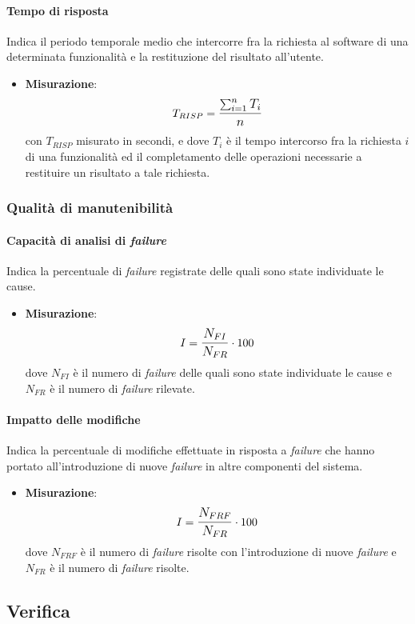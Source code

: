 \paragraph{Tempo di risposta}
Indica il periodo temporale medio che intercorre fra la richiesta al software di una determinata funzionalità e la restituzione del risultato all'utente.
\begin{itemize}
	\item \textbf{Misurazione}: 
	$$T_{RISP} = \mathlarger{\frac{\sum_{i=1}^{n} T_{i}}{n}}$$ 
	con $T_{RISP}$ misurato in secondi, e dove $T_{i}$ è il tempo intercorso fra la richiesta $i$ di una funzionalità ed il completamento delle operazioni necessarie a restituire un risultato a tale richiesta.
\end{itemize}
\subsubsection{Qualità di manutenibilità}

\paragraph{Capacità di analisi di \textit{failure}}
Indica la percentuale di \textit{failure} registrate delle quali sono state individuate le cause.
\begin{itemize}
	\item \textbf{Misurazione}: 
	$$I=\mathlarger{\frac{N_{FI}}{N_{FR}}} \cdot 100$$
	dove $N_{FI}$ è il numero di \textit{failure} delle quali sono state individuate le cause e $N_{FR}$ è il numero di \textit{failure} rilevate.
\end{itemize}

\paragraph{Impatto delle modifiche}
Indica la percentuale di modifiche effettuate in risposta a \textit{failure} che hanno portato all'introduzione di nuove \textit{failure} in altre componenti del sistema.
\begin{itemize}
	\item \textbf{Misurazione}: 
	$$I=\mathlarger{\frac{N_{FRF}}{N_{FR}}} \cdot 100$$
	dove $N_{FRF}$ è il numero di \textit{failure} risolte con l'introduzione di nuove \textit{failure} e $N_{FR}$ è il numero di \textit{failure} risolte.
\end{itemize}

\subsection{Verifica}

